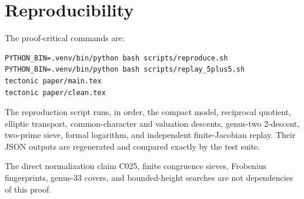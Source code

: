 \documentclass[11pt]{article}
\begin{document}
\section*{Reproducibility}

The proof-critical commands are:
\begin{verbatim}
PYTHON_BIN=.venv/bin/python bash scripts/reproduce.sh
PYTHON_BIN=.venv/bin/python bash scripts/replay_5plus5.sh
tectonic paper/main.tex
tectonic paper/clean.tex
\end{verbatim}
The reproduction script runs, in order, the compact model, reciprocal
quotient, elliptic transport, common-character and valuation descents,
genus-two 2-descent, two-prime sieve, formal logarithm, and independent
finite-Jacobian replay.  Their JSON outputs are regenerated and compared
exactly by the test suite.

The direct normalization claim C025, finite congruence sieves, Frobenius
fingerprints, genus-$33$ covers, and bounded-height searches are not
dependencies of this proof.
\end{document}
